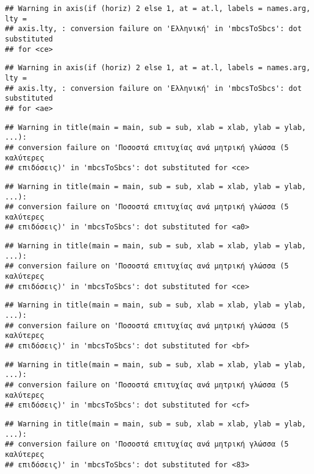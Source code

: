 \documentclass[
]{article}
\begin{document}
\begin{verbatim}
## Warning in axis(if (horiz) 2 else 1, at = at.l, labels = names.arg, lty =
## axis.lty, : conversion failure on 'Ελληνική' in 'mbcsToSbcs': dot substituted
## for <ce>
\end{verbatim}

\begin{verbatim}
## Warning in axis(if (horiz) 2 else 1, at = at.l, labels = names.arg, lty =
## axis.lty, : conversion failure on 'Ελληνική' in 'mbcsToSbcs': dot substituted
## for <ae>
\end{verbatim}

\begin{verbatim}
## Warning in title(main = main, sub = sub, xlab = xlab, ylab = ylab, ...):
## conversion failure on 'Ποσοστά επιτυχίας ανά μητρική γλώσσα (5 καλύτερες
## επιδόσεις)' in 'mbcsToSbcs': dot substituted for <ce>
\end{verbatim}

\begin{verbatim}
## Warning in title(main = main, sub = sub, xlab = xlab, ylab = ylab, ...):
## conversion failure on 'Ποσοστά επιτυχίας ανά μητρική γλώσσα (5 καλύτερες
## επιδόσεις)' in 'mbcsToSbcs': dot substituted for <a0>
\end{verbatim}

\begin{verbatim}
## Warning in title(main = main, sub = sub, xlab = xlab, ylab = ylab, ...):
## conversion failure on 'Ποσοστά επιτυχίας ανά μητρική γλώσσα (5 καλύτερες
## επιδόσεις)' in 'mbcsToSbcs': dot substituted for <ce>
\end{verbatim}

\begin{verbatim}
## Warning in title(main = main, sub = sub, xlab = xlab, ylab = ylab, ...):
## conversion failure on 'Ποσοστά επιτυχίας ανά μητρική γλώσσα (5 καλύτερες
## επιδόσεις)' in 'mbcsToSbcs': dot substituted for <bf>
\end{verbatim}

\begin{verbatim}
## Warning in title(main = main, sub = sub, xlab = xlab, ylab = ylab, ...):
## conversion failure on 'Ποσοστά επιτυχίας ανά μητρική γλώσσα (5 καλύτερες
## επιδόσεις)' in 'mbcsToSbcs': dot substituted for <cf>
\end{verbatim}

\begin{verbatim}
## Warning in title(main = main, sub = sub, xlab = xlab, ylab = ylab, ...):
## conversion failure on 'Ποσοστά επιτυχίας ανά μητρική γλώσσα (5 καλύτερες
## επιδόσεις)' in 'mbcsToSbcs': dot substituted for <83>
\end{verbatim}
\end{document}
